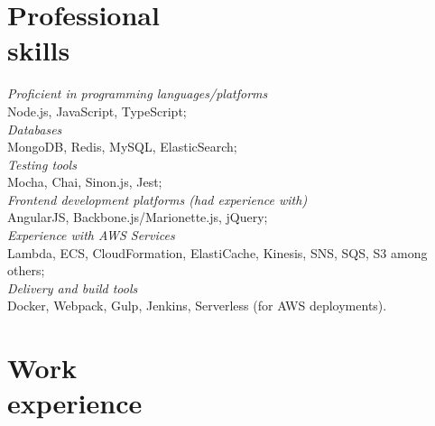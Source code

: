 \documentclass[margin, 10pt]{res} %
\begin{document}
\begin{resume}
\vspace*{-0.5cm}
\section{Professional\\ skills}
{\sl  Proficient in programming languages/platforms}  \\
\-\hspace{0.5cm} Node.js, JavaScript, TypeScript;\\
{\sl Databases }\\
\-\hspace{0.5cm} MongoDB, Redis, MySQL, ElasticSearch; \\
{\sl Testing tools }\\
\-\hspace{0.5cm} Mocha, Chai, Sinon.js, Jest; \\
{\sl Frontend development platforms (had experience with) }\\
\-\hspace{0.5cm} AngularJS,  Backbone.js/Marionette.js, jQuery;\\
{\sl Experience with AWS Services } \\
\-\hspace{0.5cm}  Lambda, ECS, CloudFormation, ElastiCache, Kinesis, SNS, SQS, S3 among others; \\
{\sl Delivery and build tools } \\
\-\hspace{0.5cm} Docker, Webpack, Gulp, Jenkins, Serverless (for AWS deployments).

\section{Work\\ experience}


\end{resume}
\end{document}
